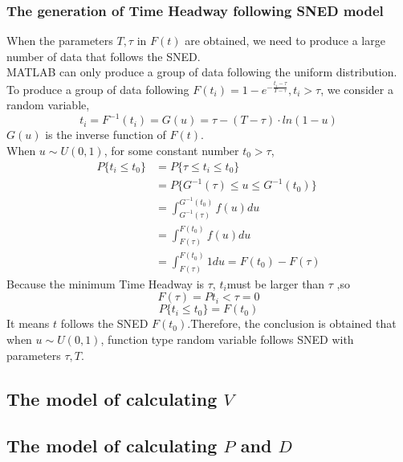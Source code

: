 \documentclass{mcmthesis}
\begin{document}
\subsubsection{The generation of Time Headway following SNED model}
\indent When the parameters $T, \tau $ in $F(t)$ are obtained, we need to produce a large number of data that follows the SNED.\\
\indent MATLAB can only produce a group of data following the uniform distribution. To produce a group of data following $ F(t_{i})=1-e^{-\frac{t_{i}-\tau}{T-\tau}},t_{i}>\tau $, we consider a random variable, 
\begin{equation}
	t_{i}=F^{-1}(t_{i})=G(u)=\tau-(T-\tau)\cdot ln(1-u)
\end{equation}
\indent $G(u)$ is the inverse function of $F(t)$.\\
\indent When $ u \sim U(0,1) $, for some constant number $t_{0}>\tau$,\\
\begin{equation}
\begin{split}
	P\{t_{i}\leqslant t_{0}\}&=P\{\tau\leqslant t_{i} \leqslant t_{0} \}\\
&=P\{ G^{-1}(\tau)\leqslant u \leqslant G^{-1}(t_{0})\}\\
&=\int_{G^{-1}(\tau)}^{G^{-1}(t_{0})}f(u)du\\
&=\int_{F(\tau)}^{F(t_{0})}f(u)du\\
&=\int_{F(\tau)}^{F(t_{0})}1du=F(t_{0})-F(\tau)
\end{split}
\end{equation}
\indent Because the minimum Time Headway is $\tau$, $ t_{i} $must be larger than $\tau$ ,so\\
\begin{equation}
	F(\tau)=P{t_{i}<\tau}=0
\end{equation}
\begin{equation}
	P\{t_{i} \leqslant t_{0} \}=F(t_{0})
\end{equation}
\indent It means $t$ follows the SNED $F(t_{0})$.Therefore, the conclusion is obtained that when $ u \sim U(0,1) $, function type random variable follows SNED with parameters $\tau , T $. 

\subsection{The model of calculating $V$}
\label{velocity change}

\subsection{The model of calculating $P$ and $D$}
\end{document}
